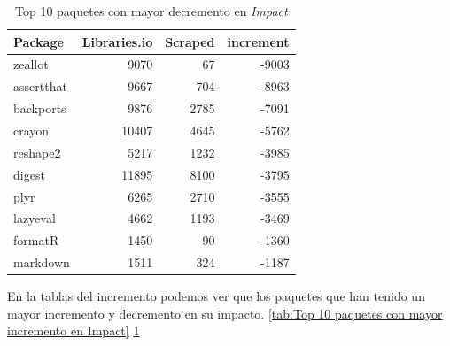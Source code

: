 \begin{table}[ht!]
    \begin{center}
        \begin{tabular}{|l|r|r|r|}
            \hline
            \textbf{Package} & \textbf{Libraries.io} & \textbf{Scraped} & \textbf{increment} \\
            \hline
            zeallot          & 9070                  & 67               & -9003              \\
            assertthat       & 9667                  & 704              & -8963              \\
            backports        & 9876                  & 2785             & -7091              \\
            crayon           & 10407                 & 4645             & -5762              \\
            reshape2         & 5217                  & 1232             & -3985              \\
            digest           & 11895                 & 8100             & -3795              \\
            plyr             & 6265                  & 2710             & -3555              \\
            lazyeval         & 4662                  & 1193             & -3469              \\
            formatR          & 1450                  & 90               & -1360              \\
            markdown         & 1511                  & 324              & -1187              \\
            \hline
        \end{tabular}
    \end{center}
    \caption{Top 10 paquetes con mayor decremento en \textit{Impact}}
    \label{tab:Top 10 paquetes con mayor decremento en Impact}
\end{table}


En la tablas del incremento podemos ver que los paquetes que han tenido un mayor incremento y decremento
en su impacto. \ref{tab:Top 10 paquetes con mayor incremento en Impact} \ref{tab:Top 10 paquetes con mayor decremento en Impact}



